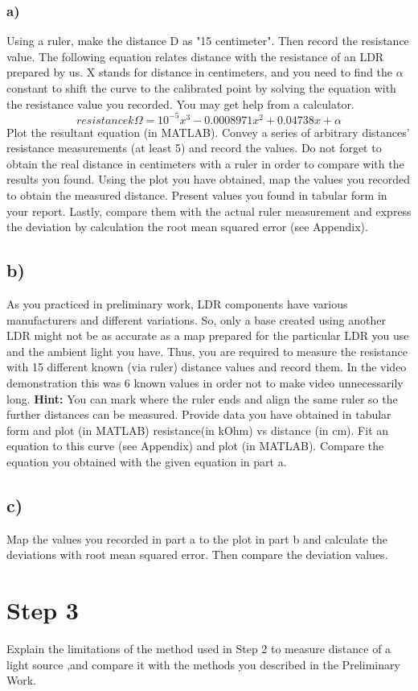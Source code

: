 \documentclass[letterpaper,12pt]{article}
\begin{document}
\subsubsection*{a)}
Using a ruler, make the distance D as "15 centimeter". Then record the resistance value. The following equation relates distance with the resistance of an LDR prepared by us. X stands for distance in centimeters, and you need to find the \(\alpha\) constant to shift the curve to the calibrated point by solving the equation with the resistance value you recorded. You may get help from a calculator.
\[resistance   k\Omega = 10^{-5} x^3 -0.0008971 x^2 + 0.04738x + \alpha\] 
Plot the resultant equation (in MATLAB). Convey a series of arbitrary distances' resistance measurements (at least 5) and record the values. Do not forget to obtain the real distance in centimeters with a ruler in order to compare with the results you found. Using the plot you have obtained, map the values you recorded to obtain the measured distance. Present values you found in tabular form in your report. Lastly, compare them with the actual ruler measurement and express the deviation by calculation the root mean squared error (see Appendix).\\
\subsection*{b)}
As you practiced in preliminary work, LDR components have various manufacturers and different variations. So, only a base created using another LDR might not be as accurate as a map prepared for the particular LDR you use and the ambient light you have. Thus, you are required to measure the resistance with 15 different known (via ruler) distance values and record them. In the video demonstration this was 6 known values in order not to make video unnecessarily long. \textbf{Hint:} You can mark where the ruler ends and align the same ruler so the further distances can be measured. Provide data you have obtained in tabular form and plot (in MATLAB) resistance(in kOhm) vs distance (in cm). Fit an equation to this curve (see Appendix) and plot (in MATLAB). Compare the equation you obtained with the given equation in part a. 
\subsection*{c)}
Map the values you recorded in part a to the plot in part b and calculate the deviations with root mean squared error. Then compare the deviation values.
\section*{Step 3} 
Explain the limitations of the method used in Step 2 to measure distance of a light source ,and compare it with the methods you described in the Preliminary Work.
\end{document}
